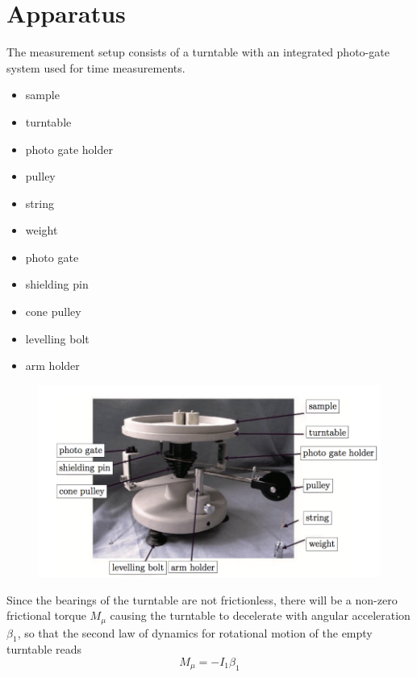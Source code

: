 \documentclass[12pt,a4paper]{article}
\begin{document}
\section{Apparatus}
The measurement setup consists of a turntable with an integrated photo-gate
system used for time measurements.
\singlespacing
\begin{itemize}
\item sample
\item turntable
\item photo gate holder
\item pulley
\item string
\item weight
\item photo gate
\item shielding pin
\item cone pulley
\item levelling bolt
\item arm holder
\end{itemize}
\doublespacing

\begin{figure}[H]
\centering
\includegraphics[width=15cm]{fig/app/turntable}
\end{figure}

Since the bearings of the turntable are not frictionless, there will be a
non-zero frictional torque $M_μ$ causing the turntable to decelerate with
angular acceleration $\beta_1$, so that the second law of dynamics for
rotational motion of the empty turntable reads $$   M_\mu = -I_1\beta_1  $$
\end{document}
